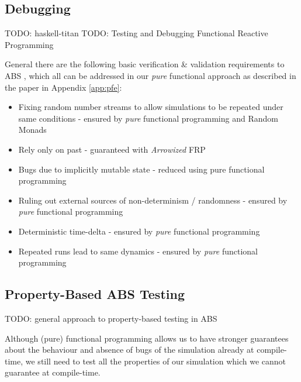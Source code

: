 \subsection{Debugging}
TODO: haskell-titan
TODO: Testing and Debugging Functional Reactive Programming \cite{perez_testing_2017}

General there are the following basic verification \& validation requirements to ABS \cite{robinson_simulation:_2014}, which all can be addressed in our \textit{pure} functional approach as described in the paper in Appendix \ref{app:pfe}:

\begin{itemize}
	\item Fixing random number streams to allow simulations to be repeated under same conditions - ensured by \textit{pure} functional programming and Random Monads
	\item Rely only on past - guaranteed with \textit{Arrowized} FRP
	\item Bugs due to implicitly mutable state - reduced using pure functional programming
	\item Ruling out external sources of non-determinism / randomness - ensured by \textit{pure} functional programming
	\item Deterministic time-delta - ensured by \textit{pure} functional programming
	\item Repeated runs lead to same dynamics - ensured by \textit{pure} functional programming
\end{itemize}

\subsection{Property-Based ABS Testing}
TODO: general approach to property-based testing in ABS

Although (pure) functional programming allows us to have stronger guarantees about the behaviour and absence of bugs of the simulation already at compile-time, we still need to test all the properties of our simulation which we cannot guarantee at compile-time.

